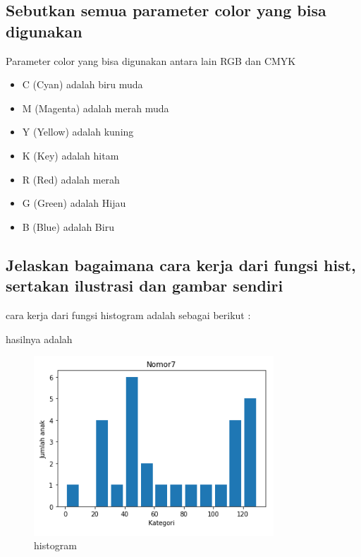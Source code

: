 \subsection{Sebutkan semua parameter color yang bisa digunakan}
Parameter color yang bisa digunakan antara lain RGB dan CMYK
\begin{itemize}
    \item C (Cyan) adalah biru muda
    \item M (Magenta) adalah merah muda
    \item Y (Yellow) adalah kuning
    \item K (Key) adalah hitam
    \item R (Red) adalah merah
    \item G (Green) adalah Hijau
    \item B (Blue) adalah Biru
    
\end{itemize}

\subsection{Jelaskan bagaimana cara kerja dari fungsi hist, sertakan ilustrasi dan gambar sendiri}
cara kerja dari fungsi histogram adalah sebagai berikut :

hasilnya adalah
\begin{figure}[H]
    \includegraphics[width=9cm]{figures/6/Teori/1174096/7his.png}
    \caption{histogram}
    \centering
\end{figure}


